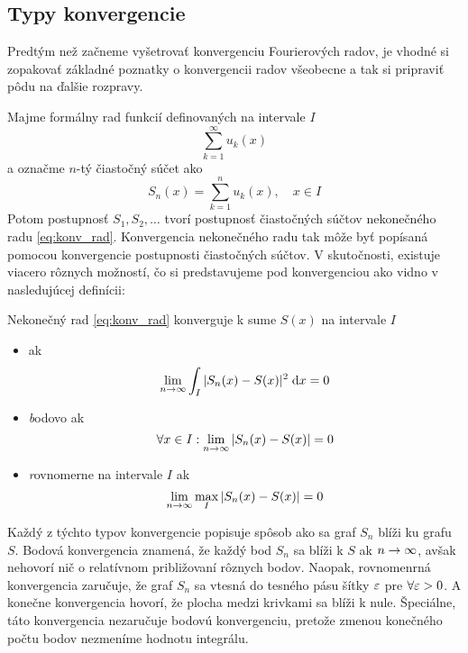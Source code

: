 \subsection{Typy konvergencie}

Predtým než začneme vyšetrovať konvergenciu Fourierových radov, je
vhodné si zopakovať základné poznatky o konvergencii radov všeobecne
a tak si pripraviť pôdu na ďalšie rozpravy.

Majme formálny rad funkcií definovaných na intervale $I$
\begin{equation}
    \sum_{k=1}^{\infty} u_k(x)
    \label{eq:konv_rad}
\end{equation}
a označme $n$-tý čiastočný súčet ako
\begin{equation}
    S_n(x) = \sum_{k=1}^{n} u_k(x), \quad x\in I
    \label{eq:konv_sucet}
\end{equation}
Potom postupnosť $S_1,S_2, \dots$ tvorí postupnosť čiastočných súčtov
nekonečného radu \ref{eq:konv_rad}. Konvergencia nekonečného radu tak
môže byť popísaná pomocou konvergencie postupnosti čiastočných súčtov.
V skutočnosti, existuje viacero rôznych možností, čo si predstavujeme
pod konvergenciou ako vidno v nasledujúcej definícii:

\begin{definicia}
    Nekonečný rad \ref{eq:konv_rad} konverguje k sume $S(x)$ na
    intervale $I$
    \begin{itemize}
        \item {\emph{}} ak 
            \begin{equation}
                \lim_{n \rightarrow \infty} \int_I |S_n(x) - S(x)|^2 \; \mathrm{d} x = 0
            \end{equation}
        \item {\emph bodovo} ak 
            \begin{equation}
                \forall x\in I: \lim_{n \rightarrow \infty} |S_n(x) - S(x)| = 0
            \end{equation}
        \item {\emph rovnomerne na intervale $I$} ak 
            \begin{equation}
                \lim_{n \rightarrow \infty} \max_I |S_n(x) - S(x)| = 0
            \end{equation}        
    \end{itemize}
\end{definicia}
Každý z týchto typov konvergencie popisuje spôsob ako sa graf $S_n$
blíži ku grafu $S$.
Bodová konvergencia znamená, že každý bod $S_n$ sa blíži k $S$ ak
$n\rightarrow\infty$, avšak nehovorí nič o relatívnom približovaní rôznych
bodov. Naopak, rovnomenrná konvergencia zaručuje, že graf $S_n$ sa
vtesná do tesného pásu šítky $\varepsilon$ pre $\forall \varepsilon>0$.
A konečne  konvergencia hovorí, že plocha medzi
krivkami sa blíži k nule. Špeciálne, táto konvergencia nezaručuje
bodovú konvergenciu, pretože zmenou konečného počtu bodov nezmeníme
hodnotu integrálu.

